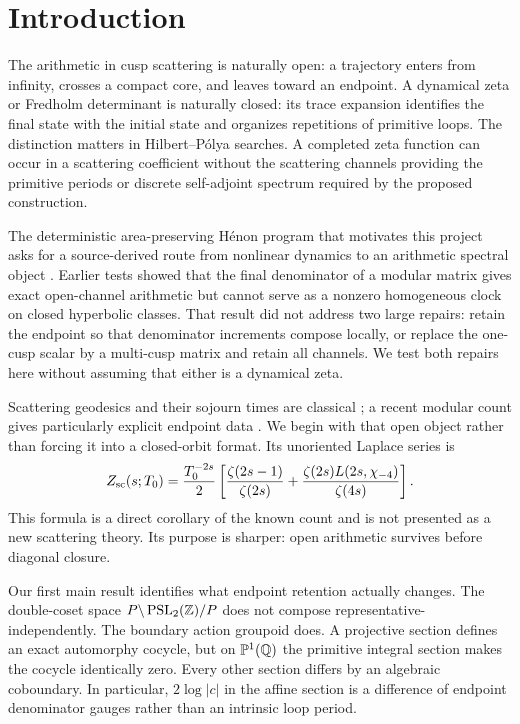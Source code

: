 \section{Introduction}

The arithmetic in cusp scattering is naturally open: a trajectory enters
from infinity, crosses a compact core, and leaves toward an endpoint.  A
dynamical zeta or Fredholm determinant is naturally closed: its trace expansion
identifies the final state with the initial state and organizes repetitions of
primitive loops.  The distinction matters in Hilbert--P\'olya searches.  A
completed zeta function can occur in a scattering coefficient without the
scattering channels providing the primitive periods or discrete self-adjoint
spectrum required by the proposed construction.

The deterministic area-preserving H\'enon program that motivates this project
asks for a source-derived route from nonlinear dynamics to an arithmetic
spectral object \cite{Wang2026Henon}.  Earlier tests showed that the final
denominator of a modular matrix gives exact open-channel arithmetic but cannot
serve as a nonzero homogeneous clock on closed hyperbolic classes.  That result
did not address two large repairs: retain the endpoint so that denominator
increments compose locally, or replace the one-cusp scalar by a multi-cusp
matrix and retain all channels.  We test both repairs here without assuming
that either is a dynamical zeta.

Scattering geodesics and their sojourn times are classical
\cite{Guillemin1976,JiZworski2001,JiZworski2002}; a recent modular count gives
particularly explicit endpoint data \cite{PujahariSatpathy2025}.  We begin
with that open object rather than forcing it into a closed-orbit format.  Its
unoriented Laplace series is
\begin{equation}
Z_{\rm sc}(s;T_0)=\frac{T_0^{-2s}}2\left[
\frac{\zeta(2s-1)}{\zeta(2s)}+
\frac{\zeta(2s)L(2s,\chi_{-4})}{\zeta(4s)}\right].
\label{eq:intro-open-series}
\end{equation}
This formula is a direct corollary of the known count and is not presented as
a new scattering theory.  Its purpose is sharper: open arithmetic survives
before diagonal closure.

Our first main result identifies what endpoint retention actually changes.
The double-coset space \(P\backslash\operatorname{PSL}_2(\mathbb{Z})/P\) does not compose
representative-independently.  The boundary action groupoid does.  A
projective section defines an exact automorphy cocycle, but on
\(\mathbb P^1(\mathbb{Q})\) the primitive integral section makes the cocycle
identically zero.  Every other section differs by an algebraic coboundary.  In
particular, \(2\log|c|\) in the affine section is a difference of endpoint
denominator gauges rather than an intrinsic loop period.

